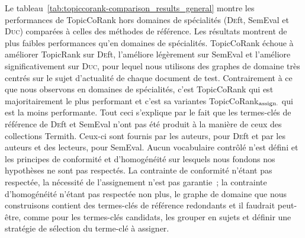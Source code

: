         Le tableau~\ref{tab:topiccorank-comparison_results_general} montre les
        performances de TopicCoRank hors domaines de spécialités (\textsc{De}ft,
        SemEval et \textsc{Duc}) comparées à celles des méthodes de référence.
        Les résultats montrent de plus faibles performances qu'en domaines de
        spécialités. TopicCoRank échoue à améliorer TopicRank sur \textsc{De}ft,
        l'améliore légèrement sur SemEval et l'améliore significativement sur
        \textsc{Duc}, pour lequel nous utilisons des graphes de domaine très
        centrés sur le sujet d'actualité de chaque document de test.
        Contrairement à ce que nous observons en domaines de spécialités, c'est
        TopicCoRank qui est majoritairement le plus performant et c'est sa
        variantes TopicCoRank$_\textnormal{assign.}$ qui est la moins
        performante. Tout ceci s'explique par le fait que les termes-clés de
        référence de \textsc{De}ft et SemEval n'ont pas été produit à la manière
        de ceux des collections Termith. Ceux-ci sont fournis par les auteurs,
        pour \textsc{De}ft et par les auteurs et des lecteurs, pour SemEval.
        Aucun vocabulaire contrôlé n'est défini et les principes de conformité
        et d'homogénéité sur lesquels nous fondons nos hypothèses ne sont pas
        respectés. La contrainte de conformité n'étant pas respectée, la
        nécessité de l'assignement n'est pas garantie~; la contrainte
        d'homogénéité n'étant pas respectée non plus, le graphe de domaine que
        nous construisons contient des termes-clés de référence redondants et il
        faudrait peut-être, comme pour les termes-clés candidats, les grouper en
        sujets et définir une stratégie de sélection du terme-clé à assigner.
